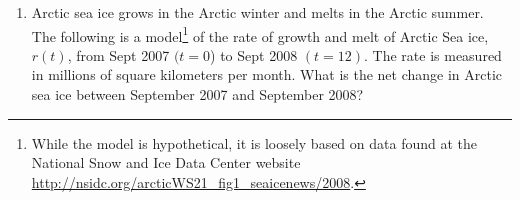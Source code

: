 \documentclass[main]{subfiles}
\begin{document}
\begin{enumerate}
{\begin{enumerate}
    \end{enumerate}

  }

\pspace{\vfill}

\item 
  \begin{problem}
    Arctic sea ice grows in the Arctic winter and melts in the Arctic
    summer. The following is a model\footnote{While the model is
      hypothetical, it is loosely based on data found at the National Snow
      and Ice Data Center website
      \url{http://nsidc.org/arcticWS21_fig1_seaicenews/2008}.}  of the
    rate of growth and melt of Arctic Sea ice, $r(t)$, from Sept 2007 $(t=
    0$) to Sept 2008 $(t=12)$. The rate is measured in millions of square
    kilometers per month.  What is the net change in Arctic sea ice
    between September 2007 and September 2008?
  \end{problem}


  \pspace{\vfill}


\end{enumerate}
\end{document}
